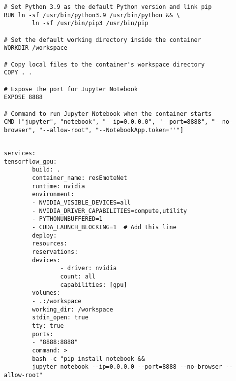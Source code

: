 \begin{lstlisting}[style=dockerstyle, caption={Dockerfile pre rozpoznávanie emócií}, label={lst:dockerfile}]
# Set Python 3.9 as the default Python version and link pip
RUN ln -sf /usr/bin/python3.9 /usr/bin/python && \
        ln -sf /usr/bin/pip3 /usr/bin/pip

# Set the default working directory inside the container
WORKDIR /workspace

# Copy local files to the container's workspace directory
COPY . .

# Expose the port for Jupyter Notebook
EXPOSE 8888

# Command to run Jupyter Notebook when the container starts
CMD ["jupyter", "notebook", "--ip=0.0.0.0", "--port=8888", "--no-browser", "--allow-root", "--NotebookApp.token=''"]
        
\end{lstlisting}

\begin{lstlisting}[style=dockerstyle, caption={docker-compose.yml pre systém rozpoznávania emócií}, label={lst:docker-compose}]
services:
tensorflow_gpu:
        build: .
        container_name: resEmoteNet
        runtime: nvidia
        environment:
        - NVIDIA_VISIBLE_DEVICES=all
        - NVIDIA_DRIVER_CAPABILITIES=compute,utility
        - PYTHONUNBUFFERED=1
        - CUDA_LAUNCH_BLOCKING=1  # Add this line
        deploy:
        resources:
        reservations:
        devices:
                - driver: nvidia
                count: all
                capabilities: [gpu]
        volumes:
        - .:/workspace
        working_dir: /workspace
        stdin_open: true
        tty: true
        ports:
        - "8888:8888"
        command: >
        bash -c "pip install notebook && 
        jupyter notebook --ip=0.0.0.0 --port=8888 --no-browser --allow-root"
      
\end{lstlisting}